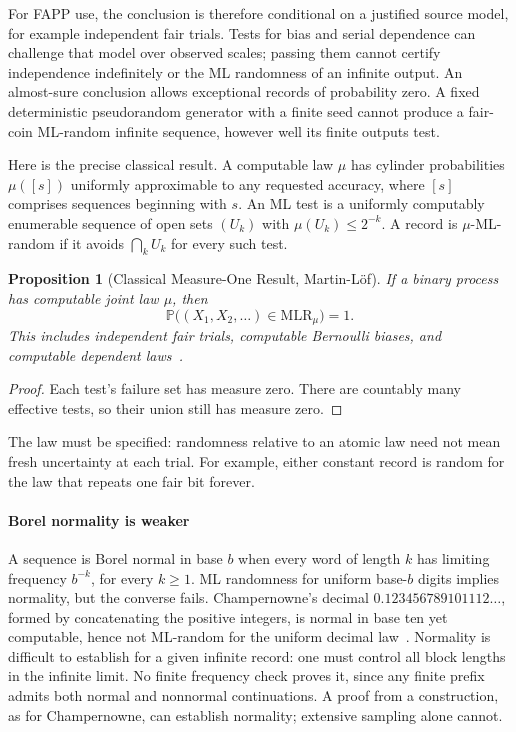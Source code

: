 \documentclass[aps,pra,reprint,superscriptaddress,amsmath,amssymb,floatfix]{revtex4-2}
\theoremstyle{plain}
\newtheorem{proposition}[theorem]{Proposition}
\theoremstyle{definition}
\theoremstyle{remark}
\begin{document}
For FAPP use, the conclusion is therefore conditional on a justified source
model, for example independent fair trials. Tests for bias and serial
dependence can challenge that model over observed scales; passing them cannot
certify independence indefinitely or the ML randomness of an infinite output.
An almost-sure conclusion allows exceptional records of probability zero.
A fixed deterministic pseudorandom generator with a finite seed cannot produce
a fair-coin ML-random infinite sequence, however well its finite outputs test.

Here is the precise classical result. A computable law \(\mu\) has cylinder
probabilities \(\mu([s])\) uniformly approximable to any requested accuracy,
where \([s]\) comprises sequences beginning with \(s\). An ML test is a
uniformly computably enumerable sequence of open sets \((U_k)\) with
\(\mu(U_k)\leq2^{-k}\). A record is \(\mu\)-ML-random if it avoids
\(\bigcap_kU_k\) for every such test.

\begin{proposition}[Classical Measure-One Result, Martin-L\"of]
  \label{prop:process-ml}
  If a binary process has computable joint law \(\mu\), then
  \begin{equation}
    \mathbb P\bigl((X_1,X_2,\ldots)\in\mathrm{MLR}_\mu\bigr)=1.
    \label{eq:process-ml}
  \end{equation}
  This includes independent fair trials, computable Bernoulli biases, and
  computable dependent laws~\cite[Sec.~IV]{MartinLof1966}.
\end{proposition}

\begin{proof}
Each test's failure set has measure zero. There are countably many effective
tests, so their union still has measure zero.
\end{proof}

The law must be specified: randomness relative to an atomic law need not mean
fresh uncertainty at each trial. For example, either constant record is random
for the law that repeats one fair bit forever.

\paragraph{Borel normality is weaker}
\label{par:normality}

A sequence is Borel normal in base \(b\) when every word of length \(k\)
has limiting frequency \(b^{-k}\), for every \(k\geq1\).
ML randomness for uniform base-\(b\) digits implies normality, but the converse
fails. Champernowne's decimal
\(0.123456789101112\ldots\), formed by concatenating the positive integers,
is normal in base ten yet computable, hence not ML-random for the uniform
decimal law~\cite{ch1}. Normality is difficult to establish for a given
infinite record: one must control all block lengths in the infinite limit.
No finite frequency check proves it, since any finite prefix admits both
normal and nonnormal continuations. A proof from a construction, as for
Champernowne, can establish normality; extensive sampling alone cannot.
\end{document}
